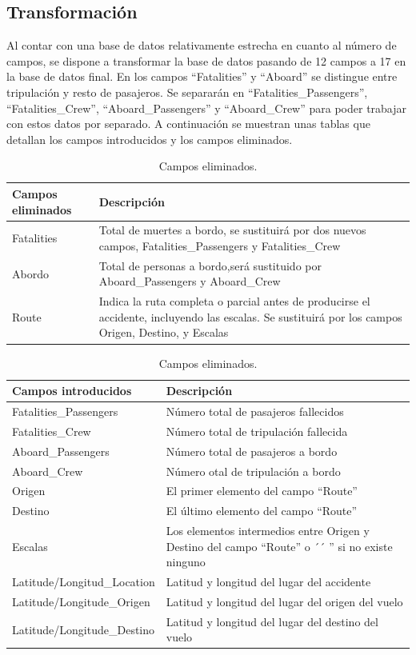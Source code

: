 \documentclass[a4paper,10pt]{article}
\begin{document}
\subsection{Transformaci\'on}
Al contar con una base de datos relativamente estrecha en cuanto al n\'umero de campos, se dispone a transformar la base de datos pasando de 12 campos a 17 en la base de datos final.
\singlespacing
En los campos ``Fatalities'' y ``Aboard'' se distingue entre tripulaci\'on y resto de pasajeros. Se separar\'an en ``Fatalities\_Passengers'', ``Fatalities\_Crew'', ``Aboard\_Passengers'' y ``Aboard\_Crew'' para poder trabajar con estos datos por separado. A continuaci\'on se muestran unas tablas que detallan los campos introducidos y los campos eliminados.
\singlespacing
\begin{table}[htbp]
\centering
\begin{tabular}{p{3cm} p{7cm}}
\hline \hline
Campos eliminados& Descripci\'on\\
\hline \hline
Fatalities &Total de muertes a bordo, se sustituir\'a por dos nuevos campos, Fatalities\_Passengers y Fatalities\_Crew\\
\hline
Abordo&Total de personas a bordo,ser\'a sustituido por Aboard\_Passengers y Aboard\_Crew\\
\hline
Route & Indica la ruta completa o parcial antes de producirse el accidente, incluyendo las escalas. Se sustituir\'a por los campos Origen, Destino, y Escalas\\
\hline \hline
\end{tabular}
\caption{Campos eliminados.}
\label{tabla:autores}
\end{table}
\pagebreak
\begin{table}[htbp]
\centering
\begin{tabular}{p{5cm} p{5cm}}
\hline \hline
Campos introducidos &Descripci\'on\\
\hline \hline
\hline
Fatalities\_Passengers &N\'umero total de pasajeros fallecidos\\
\hline
Fatalities\_Crew&N\'umero total de tripulaci\'on fallecida\\
\hline
Aboard\_Passengers & N\'umero total de pasajeros a bordo\\
\hline
Aboard\_Crew &N\'umero otal de tripulaci\'on a bordo\\
\hline
Origen&El primer elemento del campo ``Route''\\
\hline
Destino& El \'ultimo elemento del campo ``Route''\\
\hline
Escalas & Los elementos intermedios entre Origen y Destino del campo ``Route'' o ´´ '' si no existe ninguno\\
\hline
Latitude/Longitud\_Location & Latitud  y longitud del lugar del accidente\\
\hline
Latitude/Longitude\_Origen&Latitud  y longitud del lugar del origen del vuelo\\
\hline
Latitude/Longitude\_Destino&Latitud  y longitud del lugar del destino del vuelo\\
\hline \hline
\end{tabular}
\caption{Campos eliminados.}
\label{tabla:autores}
\end{table}
\end{document}
